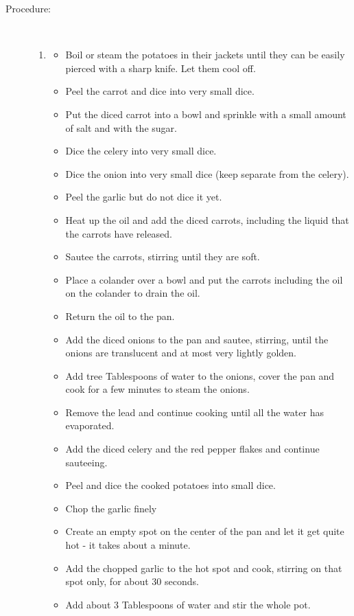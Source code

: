 \documentclass[11pt,letterpaper]{article}
\begin{document}
\begin{description}
\item[Procedure:]\ \\
	\begin{enumerate}
	\item[Prep the vegetables]
	\begin{itemize}
        \item Boil or steam the potatoes in their jackets until they can be easily pierced with a sharp knife. Let them cool off.
        \item Peel the carrot and dice into very small dice.
        \item Put the diced carrot into a bowl and sprinkle with a small amount of salt and with the sugar.
        \item Dice the celery into very small dice.
        \item Dice the onion into very small dice (keep separate from the celery).
        \item Peel the garlic but do not dice it yet.
        \item Heat up the oil and add the diced carrots, including the liquid that the carrots have released. 
        \item Sautee the carrots, stirring until they are soft.
        \item Place a colander over a bowl and put the carrots including the oil on the colander to drain the oil.
        \item Return the oil to the pan.
        \item Add the diced onions to the pan and sautee, stirring, until the onions are translucent and at most very lightly golden.
        \item Add tree Tablespoons of water to the onions, cover the pan and cook for a few minutes to steam the onions. 
        \item Remove the lead and continue cooking until all the water has evaporated.
        \item Add the diced celery and the red pepper flakes and continue sauteeing.
        \item Peel and dice the cooked potatoes into small dice.
        \item Chop the garlic finely
        \item Create an empty spot on the center of the pan and let it get quite hot - it takes about a minute.
        \item Add the chopped garlic to the hot spot and cook, stirring on that spot only, for about 30 seconds.
        \item Add about 3 Tablespoons of water and stir the whole pot.

\end{itemize}
\end{enumerate}
\end{description}
\end{document}
